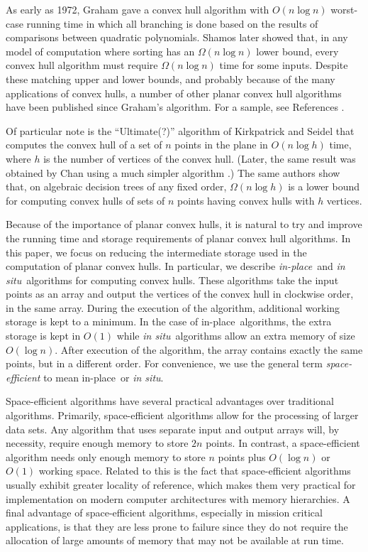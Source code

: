 \documentclass{elsart}
\newcommand{\insitu}{\emph{in situ}}
\newcommand{\inplace}{in-place}
\begin{document}
As early as 1972, Graham \cite{g72} gave a convex hull algorithm with
$O(n\log n)$ worst-case running time in which all branching is done
based on the results of comparisons between quadratic polynomials.
Shamos \cite{s78} later showed that, in any model of computation where
sorting has an $\Omega(n\log n)$ lower bound, every convex hull
algorithm must require $\Omega(n\log n)$ time for some inputs.
Despite these matching upper and lower bounds, and probably because of
the many applications of convex hulls, a number of other planar convex
hull algorithms have been published since Graham's algorithm.  For a
sample, see References
\cite{a79,bs97,csy97,cs88,e77,j73,p79,ph77,ks86,w97}.

Of particular note is the ``Ultimate(?)'' algorithm of
\mbox{Kirkpatrick} and \mbox{Seidel} \cite{ks86} that computes the
convex hull of a set of $n$ points in the plane in $O(n\log h)$ time,
where $h$ is the number of vertices of the convex hull. (Later, the
same result was obtained by Chan using a much simpler algorithm
\cite{c96}.) The same authors show that, on algebraic decision trees
of any fixed order, $\Omega(n\log h)$ is a lower bound for computing
convex hulls of sets of $n$ points having convex hulls with $h$
vertices.

Because of the importance of planar convex hulls, it is natural to try
and improve the running time and storage requirements of planar convex
hull algorithms.  In this paper, we focus on reducing the intermediate
storage used in the computation of planar convex hulls.  In
particular, we describe \emph{\inplace}\ and \insitu\ algorithms for
computing convex hulls.  These algorithms take the input points as an
array and output the vertices of the convex hull in clockwise order,
in the same array. During the execution of the algorithm, additional
working storage is kept to a minimum. In the case of \inplace\
algorithms, the extra storage is kept in $O(1)$ while \insitu\
algorithms allow an extra memory of size $O(\log n)$.  After execution
of the algorithm, the array contains exactly the same points, but in a
different order.  For convenience, we use the general term
\emph{space-efficient} to mean \inplace\ or \insitu.

Space-efficient algorithms have several practical advantages over
traditional algorithms.  Primarily, space-efficient algorithms allow
for the processing of larger data sets.  Any algorithm that uses
separate input and output arrays will, by necessity, require enough
memory to store $2n$ points.  In contrast, a space-efficient algorithm
needs only enough memory to store $n$ points plus $O(\log n)$ or
$O(1)$ working space.  Related to this is the fact that
space-efficient algorithms usually exhibit greater locality of
reference, which makes them very practical for implementation on
modern computer architectures with memory hierarchies.  A final
advantage of space-efficient algorithms, especially in mission
critical applications, is that they are less prone to failure since
they do not require the allocation of large amounts of memory that may
not be available at run time.
\end{document}

